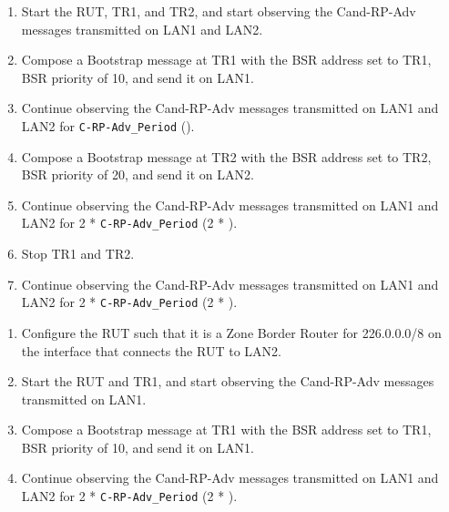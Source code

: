\documentclass[11pt]{report}
\begin{document}

\begin{enumerate}

  \item Start the RUT, TR1, and TR2, and start observing the Cand-RP-Adv
  messages transmitted on LAN1 and LAN2.

  \item Compose a Bootstrap message at TR1 with the BSR address set to TR1,
  BSR priority of 10, and send it on LAN1.

  \item Continue observing the Cand-RP-Adv messages transmitted on LAN1
  and LAN2 for \verb=C-RP-Adv_Period= ({\PimsmCRPAdvPeriod}).

  \item Compose a Bootstrap message at TR2 with the BSR address set to TR2,
  BSR priority of 20, and send it on LAN2.

  \item Continue observing the Cand-RP-Adv messages transmitted on LAN1
  and LAN2 for 2 * \verb=C-RP-Adv_Period= (2 * {\PimsmCRPAdvPeriod}).

  \item Stop TR1 and TR2.

  \item Continue observing the Cand-RP-Adv messages transmitted on LAN1
  and LAN2 for 2 * \verb=C-RP-Adv_Period= (2 * {\PimsmCRPAdvPeriod}).

\end{enumerate}


\begin{enumerate}

  \item Configure the RUT such that it is a Zone Border Router for 226.0.0.0/8
  on the interface that connects the RUT to LAN2.

  \item Start the RUT and TR1, and start observing the Cand-RP-Adv messages
  transmitted on LAN1.

  \item Compose a Bootstrap message at TR1 with the BSR address set to TR1,
  BSR priority of 10, and send it on LAN1.

  \item Continue observing the Cand-RP-Adv messages transmitted on LAN1
  and LAN2 for 2 * \verb=C-RP-Adv_Period= (2 * {\PimsmCRPAdvPeriod}).

\end{enumerate}
\end{document}
